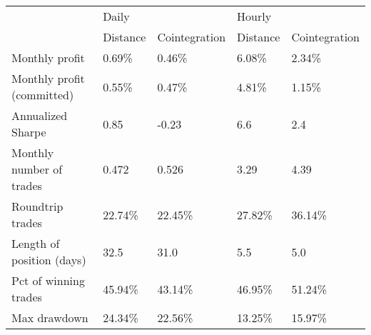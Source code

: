 \begin{tabular}{lllll}
\toprule
{} & \multicolumn{2}{l}{Daily} & \multicolumn{2}{l}{Hourly} \\
{} & Distance & Cointegration & Distance & Cointegration \\
\midrule
Monthly profit             &   0.69\% &        0.46\% &   6.08\% &        2.34\% \\
Monthly profit (committed) &   0.55\% &        0.47\% &   4.81\% &        1.15\% \\
Annualized Sharpe          &     0.85 &         -0.23 &      6.6 &           2.4 \\
Monthly number of trades   &    0.472 &         0.526 &     3.29 &          4.39 \\
Roundtrip trades           &  22.74\% &       22.45\% &  27.82\% &       36.14\% \\
Length of position (days)  &     32.5 &          31.0 &      5.5 &           5.0 \\
Pct of winning trades      &  45.94\% &       43.14\% &  46.95\% &       51.24\% \\
Max drawdown               &  24.34\% &       22.56\% &  13.25\% &       15.97\% \\
\bottomrule
\end{tabular}
